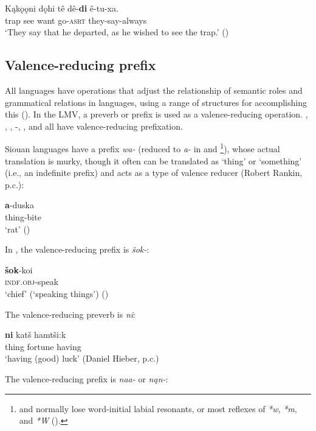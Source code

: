 \documentclass[output=paper]{LSP/langsci}
\begin{document}
\ea
\gll	Kąkǫǫni dǫhi tê dê-\textbf{di} ê-tu-xa.\\
	trap 	 see want go-\textsc{asrt} they-say-always\\
\glt `They say that he departed, as he wished to see the trap.' (\citealt[184]{DorseySwanton1912})
\z

\subsection{Valence-reducing prefix}

All languages have operations that adjust the relationship of semantic roles and grammatical relations in languages, using a range of structures for accomplishing this (\citealt[169]{Payne1997}). In the LMV, a preverb or prefix is used as a valence-reducing operation. , , , -, , and  all have valence-reducing prefixation. 	

	Siouan languages have a prefix \emph{wa-} (reduced to \emph{a-} in  and \footnote{ and  normally lose word-initial labial resonants, or most reflexes of \emph{*w}, \emph{*m}, and \emph{*W} (\citealt[19]{Rankin2002}).}), whose actual translation is murky, though it often can be translated as `thing' or `something' (i.e., an indefinite  prefix) and acts as a type of valence reducer (Robert Rankin, p.c.):

\ea
\gll	\textbf{a}-duska\\
		thing-bite\\
\glt	 `rat' (\citealt[186]{DorseySwanton1912})
\z

	In , the valence-reducing prefix is \emph{šok-}:

\ea
\gll	\textbf{šok}-koi\\
		\textsc{indf.obj}-speak \\

\glt	`chief' (`speaking things') (\citealt[9]{GatschetSwanton1932})
\z

The  valence-reducing preverb is \emph{ni}:

\ea
\gll	\textbf{ni} 	katš hamtši:k \\
	thing fortune having\\

\glt `having (good) luck' (Daniel Hieber, p.c.)
\z

	The  valence-reducing prefix is \emph{naa-} or \emph{nąn-}:
	
\end{document}
